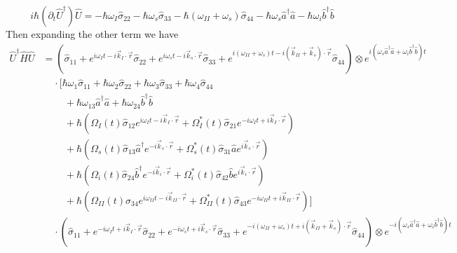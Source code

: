 \documentclass[aps,pra,showpacs,amsmath,amssymb,nofootinbib,longbibliography,superscriptaddress
]{revtex4-1}
\theoremstyle{definition}
\theoremstyle{remark}
\newcommand{\0}{\hat{0}}
\begin{document}
\begin{equation}
    i \hbar (\partial_t \hat{U}^{\dagger}) \hat{U} =
    -\hbar \omega_I \hat{\sigma}_{22} -
    \hbar \omega_s \hat{\sigma}_{33} -
    \hbar (\omega_{II} + \omega_s) \hat{\sigma}_{44} -
    \hbar \omega_s \hat{a}^{\dagger} \hat{a} -
    \hbar \omega_i \hat{b}^{\dagger} \hat{b}
\end{equation}
Then expanding the other term we have
\begin{align}
    \hat{U}^{\dagger} \hat{H} \hat{U}
    &=
    \left(\hat{\sigma}_{11} + e^{i \omega_I t - i \vec{k}_I \cdot \vec{r}} \hat{\sigma}_{22} + e^{i \omega_s t - i \vec{k}_s \cdot \vec{r}} \hat{\sigma}_{33} + e^{i(\omega_{II} + \omega_s) t - i(\vec{k}_{II} + \vec{k}_s) \cdot \vec{r}} \hat{\sigma}_{44}\right)
    \otimes e^{i(\omega_s \hat{a}^{\dagger} \hat{a} + \omega_i \hat{b}^{\dagger} \hat{b})t}\nonumber\\
    &\;\;\;\;\cdot\biggl[ \hbar \omega_1 \hat{\sigma}_{11} + \hbar \omega_2 \hat{\sigma}_{22} + \hbar \omega_3 \hat{\sigma}_{33} + \hbar \omega_4 \hat{\sigma}_{44}\nonumber \\
    &\;\;\;\;\;\;\;\;+ \hbar \omega_{13} \hat{a}^{\dagger} \hat{a} + \hbar \omega_{24} \hat{b}^{\dagger} \hat{b}\nonumber \\
    &\;\;\;\;\;\;\;\;+ \hbar \left(\Omega_{I}(t) \hat{\sigma}_{12} e^{i \omega_I t - i \vec{k}_I \cdot \vec{r}} + \Omega_{I}^*(t) \hat{\sigma}_{21} e^{-i \omega_I t + i \vec{k}_I \cdot \vec{r}}\right)\nonumber \\
    &\;\;\;\;\;\;\;\;+ \hbar \left(\Omega_{s}(t) \hat{\sigma}_{13} \hat{a}^{\dagger} e^{-i \vec{k}_{s} \cdot \vec{r}} + \Omega_{s}^*(t) \hat{\sigma}_{31} \hat{a} e^{i \vec{k}_{s} \cdot \vec{r}}\right)\nonumber \\
    &\;\;\;\;\;\;\;\;+ \hbar \left(\Omega_{i}(t) \hat{\sigma}_{24} \hat{b}^{\dagger} e^{-i \vec{k}_{i} \cdot \vec{r}} + \Omega_{i}^*(t) \hat{\sigma}_{42} \hat{b} e^{i \vec{k}_{i} \cdot \vec{r}}\right)\nonumber \\
    &\;\;\;\;\;\;\;\;+ \hbar \left(\Omega_{II}(t) \hat{\sigma}_{34} e^{i \omega_{II} t - i \vec{k}_{II} \cdot \vec{r}} + \Omega_{II}^*(t) \hat{\sigma}_{43} e^{-i \omega_{II} t + i \vec{k}_{II} \cdot \vec{r}}\right)\biggr] \nonumber\\
    &\;\;\;\; \cdot
    \left(\hat{\sigma}_{11} + e^{-i \omega_I t + i \vec{k}_I \cdot \vec{r}} \hat{\sigma}_{22} + e^{-i \omega_s t + i \vec{k}_s \cdot \vec{r}} \hat{\sigma}_{33} + e^{-i(\omega_{II} + \omega_s) t + i(\vec{k}_{II} + \vec{k}_s) \cdot \vec{r}} \hat{\sigma}_{44}\right)
    \otimes e^{-i(\omega_s \hat{a}^{\dagger} \hat{a} + \omega_i \hat{b}^{\dagger} \hat{b})t}
\end{align}
\end{document}
